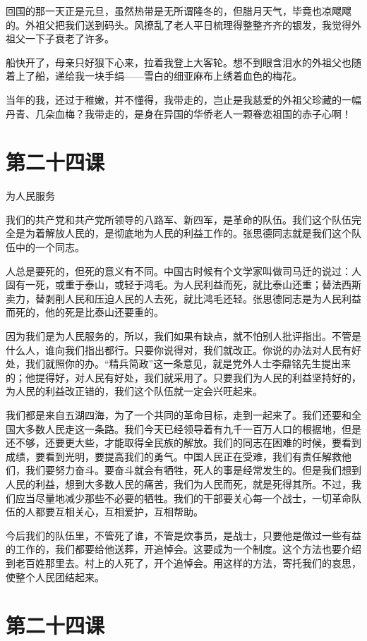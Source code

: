 \documentclass[12pt,UTF8]{ctexbook}
\begin{document}
回国的那一天正是元旦，虽然热带是无所谓隆冬的，但腊月天气，毕竟也凉飕飕的。外祖父把我们送到码头。风撩乱了老人平日梳理得整整齐齐的银发，我觉得外祖父一下子衰老了许多。

船快开了，母亲只好狠下心来，拉着我登上大客轮。想不到眼含泪水的外祖父也随着上了船，递给我一块手绢——雪白的细亚麻布上绣着血色的梅花。

当年的我，还过于稚嫩，并不懂得，我带走的，岂止是我慈爱的外祖父珍藏的一幅丹青、几朵血梅？我带走的，是身在异国的华侨老人一颗眷恋祖国的赤子心啊！

\section{第二十四课}

为人民服务

我们的共产党和共产党所领导的八路军、新四军，是革命的队伍。我们这个队伍完全是为着解放人民的，是彻底地为人民的利益工作的。张思德同志就是我们这个队伍中的一个同志。

人总是要死的，但死的意义有不同。中国古时候有个文学家叫做司马迁的说过：人固有一死，或重于泰山，或轻于鸿毛。为人民利益而死，就比泰山还重；替法西斯卖力，替剥削人民和压迫人民的人去死，就比鸿毛还轻。张思德同志是为人民利益而死的，他的死是比泰山还要重的。

因为我们是为人民服务的，所以，我们如果有缺点，就不怕别人批评指出。不管是什么人，谁向我们指出都行。只要你说得对，我们就改正。你说的办法对人民有好处，我们就照你的办。“精兵简政”这一条意见，就是党外人士李鼎铭先生提出来的；他提得好，对人民有好处，我们就采用了。只要我们为人民的利益坚持好的，为人民的利益改正错的，我们这个队伍就一定会兴旺起来。

我们都是来自五湖四海，为了一个共同的革命目标，走到一起来了。我们还要和全国大多数人民走这一条路。我们今天已经领导着有九千一百万人口的根据地，但是还不够，还要更大些，才能取得全民族的解放。我们的同志在困难的时候，要看到成绩，要看到光明，要提高我们的勇气。中国人民正在受难，我们有责任解救他们，我们要努力奋斗。要奋斗就会有牺牲，死人的事是经常发生的。但是我们想到人民的利益，想到大多数人民的痛苦，我们为人民而死，就是死得其所。不过，我们应当尽量地减少那些不必要的牺牲。我们的干部要关心每一个战士，一切革命队伍的人都要互相关心，互相爱护，互相帮助。

今后我们的队伍里，不管死了谁，不管是炊事员，是战士，只要他是做过一些有益的工作的，我们都要给他送葬，开追悼会。这要成为一个制度。这个方法也要介绍到老百姓那里去。村上的人死了，开个追悼会。用这样的方法，寄托我们的哀思，使整个人民团结起来。

\section{第二十四课}
\end{document}

